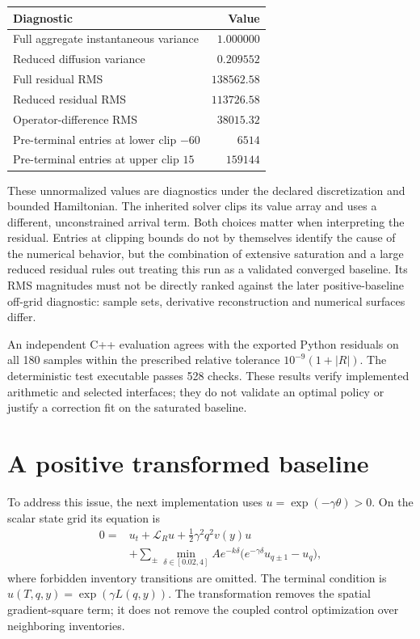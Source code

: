 \begin{center}
\begin{tabular}{@{}lr@{}}
\toprule
Diagnostic & Value \\
\midrule
Full aggregate instantaneous variance & $1.000000$ \\
Reduced diffusion variance & $0.209552$ \\
Full residual RMS & $138562.58$ \\
Reduced residual RMS & $113726.58$ \\
Operator-difference RMS & $38015.32$ \\
Pre-terminal entries at lower clip $-60$ & $6514$ \\
Pre-terminal entries at upper clip $15$ & $159144$ \\
\bottomrule
\end{tabular}
\end{center}

These unnormalized values are diagnostics under the declared discretization and bounded Hamiltonian. The inherited solver clips its value array and uses a different, unconstrained arrival term. Both choices matter when interpreting the residual. Entries at clipping bounds do not by themselves identify the cause of the numerical behavior, but the combination of extensive saturation and a large reduced residual rules out treating this run as a validated converged baseline. Its RMS magnitudes must not be directly ranked against the later positive-baseline off-grid diagnostic: sample sets, derivative reconstruction and numerical surfaces differ.

An independent C++ evaluation agrees with the exported Python residuals on all 180 samples within the prescribed relative tolerance $10^{-9}(1+|R|)$. The deterministic test executable passes 528 checks. These results verify implemented arithmetic and selected interfaces; they do not validate an optimal policy or justify a correction fit on the saturated baseline.

\section{A positive transformed baseline}
To address this issue, the next implementation uses $u=\exp(-\gamma\theta)>0$. On the scalar state grid its equation is
\begin{align*}
0={}&u_t+\mathcal L_Ru+\tfrac12\gamma^2q^2v(y)u\\
 &+\sum_{\pm}\min_{\delta\in[0.02,4]}
 Ae^{-k\delta}\bigl(e^{-\gamma\delta}u_{q\pm1}-u_q\bigr),
\end{align*}
where forbidden inventory transitions are omitted. The terminal condition is $u(T,q,y)=\exp(\gamma L(q,y))$. The transformation removes the spatial gradient-square term; it does not remove the coupled control optimization over neighboring inventories.

